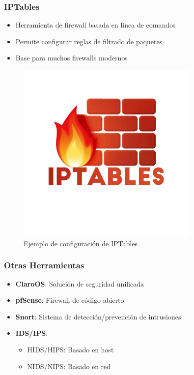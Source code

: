 \documentclass[12pt,a4paper]{article}
\begin{document}
\subsubsection{IPTables}
\begin{itemize}
    \item Herramienta de firewall basada en línea de comandos
    \item Permite configurar reglas de filtrado de paquetes
    \item Base para muchos firewalls modernos
\end{itemize}

\begin{figure}[H]
    \centering
    \includegraphics[width=0.8\textwidth]{iptables.png}
    \caption{Ejemplo de configuración de IPTables}
    \label{fig:iptables}
\end{figure}

\subsubsection{Otras Herramientas}
\begin{itemize}
    \item \textbf{ClaroOS}: Solución de seguridad unificada
    \item \textbf{pfSense}: Firewall de código abierto
    \item \textbf{Snort}: Sistema de detección/prevención de intrusiones
    \item \textbf{IDS/IPS}:
    \begin{itemize}
        \item HIDS/HIPS: Basado en host
        \item NIDS/NIPS: Basado en red
    \end{itemize}
\end{itemize}
\end{document}
